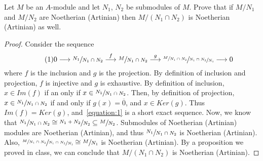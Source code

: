 \begin{problem}
    Let $M$ be an $A$-module and let $N_1$, $N_2$ be submodules of $M$.
    Prove that if $M/N_1$ and $M/N_2$ are Noetherian (Artinian) then $M/(N_1 \cap N_2)$ is Noetherian (Artinian) as well.
    \begin{sol}
        \begin{proof}
            Consider the sequence
            \[ \label{equation:1} \tag{1}
                0 \longrightarrow \sfrac{N_1}{N_1 \cap N_2} \overset{f}{\longrightarrow} \sfrac{M}{N_1 \cap N_2} \overset{g}{\longrightarrow} \sfrac{\sfrac{M}{N_1 \cap N_2}}{\sfrac{N_1 \cap N_2}{N_1}} \longrightarrow 0
            \]
            where $f$ is the inclusion and $g$ is the projection.
            By definition of inclusion and projection, $f$ is injective and $g$ is exhaustive.
            By definition of inclusion, $x \in Im(f)$ if an only if $x \in \sfrac{N_1}{N_1 \cap N_2}$.
            Then, by definition of projection, $x \in \sfrac{N_1}{N_1 \cap N_2}$ if and only if $g(x) = \overline{0}$, and $x \in Ker(g)$.
            Thus $Im(f) = Ker(g)$, and~\eqref{equation:1} is a short exact sequence.
            Now, we know that $\sfrac{N_1}{N_1 \cap N_2} \cong \sfrac{N_1 + N_2}{N_2} \subseteq \sfrac{M}{N_2}$.
            Submodules of Noetherian (Artinian) modules are Noetherian (Artinian), and thus $\sfrac{N_1}{N_1 \cap N_2}$ is Noetherian (Artinian).
            Also, $\sfrac{\sfrac{M}{N_1 \cap N_2}}{\sfrac{N_1 \cap N_2}{N_1}} \cong \sfrac{M}{N_1}$ is Noetherian (Artinian).
            By a proposition we proved in class, we can conclude that $M/(N_1 \cap N_2)$ is Noetherian (Artinian).
        \end{proof}
    \end{sol}
\end{problem}